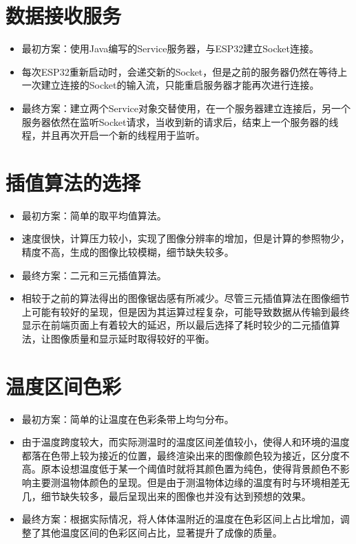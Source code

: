 \section{数据接收服务}
\begin{itemize} 
    \item 最初方案：使用Java编写的Service服务器，与ESP32建立Socket连接。
    \item 每次ESP32重新启动时，会递交新的Socket，但是之前的服务器仍然在等待上一次建立连接的Socket的输入流，只能重启服务器才能再次进行连接。
    \item 最终方案：建立两个Service对象交替使用，在一个服务器建立连接后，另一个服务器依然在监听Socket请求，当收到新的请求后，结束上一个服务器的线程，并且再次开启一个新的线程用于监听。
\end{itemize}   
\section{插值算法的选择}
\begin{itemize}
    \item 最初方案：简单的取平均值算法。
    \item 速度很快，计算压力较小，实现了图像分辨率的增加，但是计算的参照物少，精度不高，生成的图像比较模糊，细节缺失较多。
    \item 最终方案：二元和三元插值算法。
    \item 相较于之前的算法得出的图像锯齿感有所减少。尽管三元插值算法在图像细节上可能有较好的呈现，但是因为其运算过程复杂，可能导致数据从传输到最终显示在前端页面上有着较大的延迟，所以最后选择了耗时较少的二元插值算法，让图像质量和显示延时取得较好的平衡。
    \end{itemize}
\section{温度区间色彩}
\begin{itemize}
    \item 最初方案：简单的让温度在色彩条带上均匀分布。
    \item 由于温度跨度较大，而实际测温时的温度区间差值较小，使得人和环境的温度都落在色带上较为接近的位置，最终渲染出来的图像颜色较为接近，区分度不高。原本设想温度低于某一个阈值时就将其颜色置为纯色，使得背景颜色不影响主要测温物体颜色的呈现。但是由于测温物体边缘的温度有时与环境相差无几，细节缺失较多，最后呈现出来的图像也并没有达到预想的效果。
    \item 最终方案：根据实际情况，将人体体温附近的温度在色彩区间上占比增加，调整了其他温度区间的色彩区间占比，显著提升了成像的质量。
    \end{itemize}
